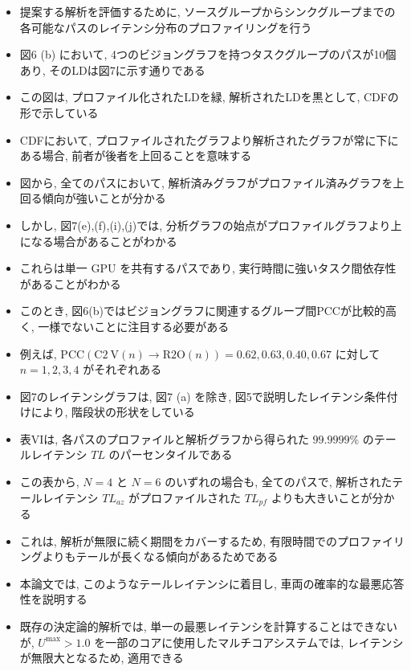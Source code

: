 \begin{frame}{}
    \begin{itemize}
        \item 提案する解析を評価するために, ソースグループからシンクグループまでの各可能なパスのレイテンシ分布のプロファイリングを行う
\item 図6 (b) において, 4つのビジョングラフを持つタスクグループのパスが10個あり, そのLDは図7に示す通りである
\item この図は, プロファイル化されたLDを緑, 解析されたLDを黒として, CDFの形で示している
\item CDFにおいて, プロファイルされたグラフより解析されたグラフが常に下にある場合, 前者が後者を上回ることを意味する
\item 図から, 全てのパスにおいて, 解析済みグラフがプロファイル済みグラフを上回る傾向が強いことが分かる
    \end{itemize}
\end{frame}

\begin{frame}{}
    \begin{itemize}
        \item しかし, 図7(e),(f),(i),(j)では, 分析グラフの始点がプロファイルグラフより上になる場合があることがわかる
\item これらは単一 GPU を共有するパスであり, 実行時間に強いタスク間依存性があることがわかる
\item このとき, 図6(b)ではビジョングラフに関連するグループ間PCCが比較的高く, 一様でないことに注目する必要がある
\item 例えば, $\mathrm{PCC}(\mathrm{C} 2 \mathrm{~V}(n) \rightarrow \mathrm{R} 2 \mathrm{O}(n))=0.62,0.63,0.40,0.67$ に対して $n=1,2,3,4$ がそれぞれある
\item 図7のレイテンシグラフは, 図7 (a) を除き, 図5で説明したレイテンシ条件付けにより, 階段状の形状をしている
    \end{itemize}
\end{frame}

\begin{frame}{}
    \begin{itemize}
        \item 表VIは, 各パスのプロファイルと解析グラフから得られた $99.9999 \%$ のテールレイテンシ $T L$ のパーセンタイルである
\item この表から, $N=4$ と $N=6$ のいずれの場合も, 全てのパスで, 解析されたテールレイテンシ $T L_{a z}$ がプロファイルされた $T L_{p f}$ よりも大きいことが分かる
\item これは, 解析が無限に続く期間をカバーするため, 有限時間でのプロファイリングよりもテールが長くなる傾向があるためである
\item 本論文では, このようなテールレイテンシに着目し, 車両の確率的な最悪応答性を説明する
\item 既存の決定論的解析では, 単一の最悪レイテンシを計算することはできないが, $U^{\max }>1.0$ を一部のコアに使用したマルチコアシステムでは, レイテンシが無限大となるため, 適用できる
    \end{itemize}
\end{frame}

